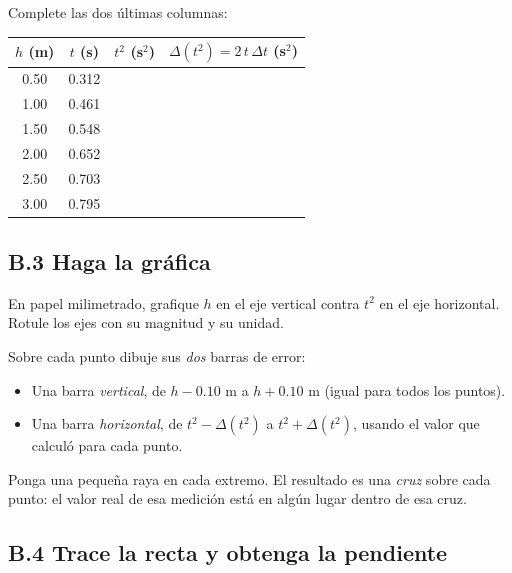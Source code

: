 \documentclass[11pt, letterpaper]{article}
\begin{document}
	\vspace{0.2cm}
	\noindent
	Complete las dos últimas columnas:
	
	\vspace{0.2cm}
	\begin{center}
		\small
		\begin{tabular}{|c|c|c|c|}
			\hline
			$h$ (m) & $t$ (s) & $t^2$ (s$^2$) & $\Delta(t^2) = 2\,t\,\Delta t$ (s$^2$) \\
			\hline
			0.50 & 0.312 & \hspace{2cm} & \hspace{2.5cm} \\ \hline
			1.00 & 0.461 & & \\ \hline
			1.50 & 0.548 & & \\ \hline
			2.00 & 0.652 & & \\ \hline
			2.50 & 0.703 & & \\ \hline
			3.00 & 0.795 & & \\ \hline
		\end{tabular}
	\end{center}
	
	\subsection*{B.3 Haga la gráfica}
	
	En papel milimetrado, grafique $h$ en el eje vertical contra $t^{2}$ en el eje
	horizontal. Rotule los ejes con su magnitud y su unidad.
	
	\vspace{0.15cm}
	\noindent
	Sobre cada punto dibuje sus \emph{dos} barras de error:
	
	\begin{itemize}
		\item Una barra \emph{vertical}, de $h - 0.10$ m a $h + 0.10$ m
		(igual para todos los puntos).
		\item Una barra \emph{horizontal}, de $t^{2} - \Delta(t^{2})$ a
		$t^{2} + \Delta(t^{2})$, usando el valor que calculó para cada punto.
	\end{itemize}
	
	\noindent
	Ponga una pequeña raya en cada extremo. El resultado es una \emph{cruz} sobre
	cada punto: el valor real de esa medición está en algún lugar dentro de esa cruz.
	
	\subsection*{B.4 Trace la recta y obtenga la pendiente}
	
\end{document}
